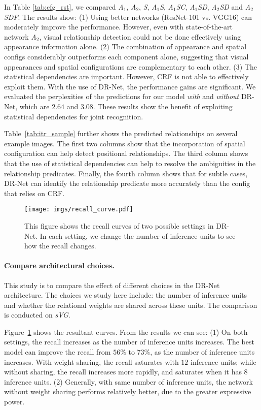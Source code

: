 \documentclass[10pt,twocolumn,letterpaper]{article}
\begin{document}
In Table \ref{tab:cfg_rst},
we compared \emph{A$_1$}, \emph{A$_2$}, \emph{S}, \emph{A$_1$S}, \emph{A$_1$SC}, \emph{A$_1$SD}, \emph{A$_2$SD} and \emph{A$_2$SDF}.
The results show:
(1) Using better networks (ResNet-101 vs. VGG16) can moderately improve the performance.
However, even with state-of-the-art network \emph{A$_2$},
visual relationship detection could not be done effectively using appearance information alone.
%
(2) The combination of appearance and spatial configs considerably outperforms each component alone,
suggesting that visual appearances and spatial configurations are complementary to each other.
%
(3) The statistical dependencies are important. However, CRF is not able to effectively exploit them.
With the use of DR-Net, the performance gains are significant.
We evaluated the perplexities of the predictions for our model \emph{with} and \emph{without} DR-Net,
which are $2.64$ and $3.08$. These results show the benefit of exploiting statistical dependencies for joint recognition.

Table~\ref{tab:itr_sample} further shows the predicted relationships on several example images.
The first two columns show that the incorporation of spatial configuration can
help detect positional relationships.
The third column shows that the use of statistical dependencies can help
to resolve the ambiguities in the relationship predicates.
Finally, the fourth column shows that for subtle cases,
DR-Net can identify the relationship predicate more accurately than
the config that relies on CRF.

\begin{figure}
    \centering
    \texttt{[image: imgs/recall\_curve.pdf]}
    \caption{\small
	This figure shows the recall curves of two possible settings in DR-Net.
        In each setting, we change the number of inference units to see how the recall changes.}
    \label{fig:drnet_curve}
\end{figure}\paragraph{Compare architectural choices.}

This study is to compare the effect of different choices in the DR-Net architecture.
The choices we study here include:
the number of inference units and whether the relational weights are shared
across these units.
The comparison is conducted on \emph{sVG}.

Figure~\ref{fig:drnet_curve} shows the resultant curves.
From the results we can see:
(1) On both settings, the recall increases as the number of inference units increases.
The best model can improve the recall from $56\%$ to $73\%$, as the number
of inference units increases.
With weight sharing, the recall saturates with $12$ inference units;
while without sharing, the recall increases more rapidly, and saturates when it has $8$ inference units.
(2) Generally, with same number of inference units,
the network without weight sharing performs relatively better,
due to the greater expressive power.
\end{document}
